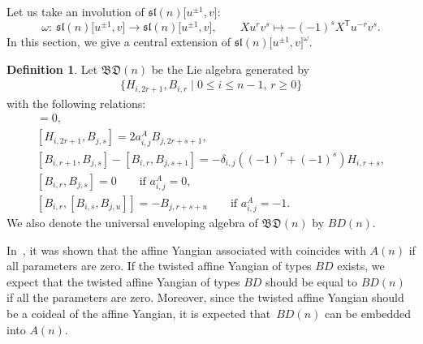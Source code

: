 \documentclass[pdftex]{sigma}
\numberwithin{equation}{section}
\theoremstyle{definition}
\newtheorem{Definition}[Theorem]{Definition}
\begin{document}
Let us take an involution of $\mathfrak{sl}(n)\bigl[u^{\pm1},v\bigr]$:
\begin{equation*}
\omega\colon\ \mathfrak{sl}(n)\bigl[u^{\pm1},v\bigr]\to\mathfrak{sl}(n)\bigl[u^{\pm1},v\bigr],\qquad Xu^rv^s\mapsto -(-1)^{s}X^{\mathsf{T}}u^{-r}v^{s}.
\end{equation*}
In this section, we give a central extension of $\mathfrak{sl}(n)\bigl[u^{\pm1},v\bigr]^\omega$.
\begin{Definition}
Let $\mathfrak{BD}(n)$ be the Lie algebra generated by
\begin{gather*}
\{H_{i,2r+1},B_{i,r}\mid0\leq i\leq n-1,\, r\geq0\}
\end{gather*}
with the following relations:
\begin{gather*}
[H_{i,2r+1},H_{j,2s+1}]=0,\\
[H_{i,2r+1},B_{j,s}]=2a^A_{i,j}B_{j,2r+s+1},\\
[B_{i,r+1},B_{j,s}]-[B_{i,r},B_{j,s+1}]=-\delta_{i,j}((-1)^r+(-1)^s)H_{i,r+s},\\
[B_{i,r},B_{j,s}]=0\qquad \text{if }a^A_{i,j}=0,\\
[B_{i,r},[B_{i,s},B_{j,u}]]=-B_{j,r+s+u}\qquad \text{if }a^A_{i,j}=-1.
\end{gather*}
We also denote the universal enveloping algebra of $\mathfrak{BD}(n)$ by $BD(n)$.
\end{Definition}
In~\cite{Gu1}, it was shown that the affine Yangian associated with  coincides with $A(n)$ if all parameters are zero. If the twisted affine Yangian of types $BD$ exists, we expect that the twisted affine Yangian of types $BD$ should be equal to $BD(n)$ if all the parameters are zero. Moreover, since the twisted affine Yangian should be a coideal of the affine Yangian, it is expected that~$BD(n)$ can be embedded into $A(n)$.
\end{document}

